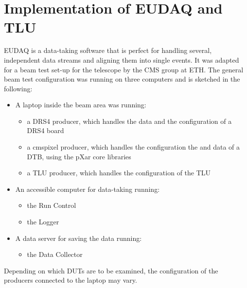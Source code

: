 \section{Implementation of EUDAQ and \ac{TLU}}
EUDAQ is a data-taking software that is perfect for handling several, independent data streams and aligning them into single events. It was adapted for a beam test set-up for the telescope by the CMS group at \ac{ETH}.
The general beam test configuration was running on three computers and is sketched in the following:
\begin{itemize}
	\item A laptop inside the beam area was running:
		\begin{itemize}
			\item a DRS4 producer, which handles the data and the configuration of a DRS4 board
			\item a cmspixel producer, which handles the configuration the and data of a \ac{DTB}, using the pXar core libraries
			\item a \ac{TLU} producer, which handles the configuration of the \ac{TLU} 
		\end{itemize}
	\item An accessible computer for data-taking running:
		\begin{itemize}
			\item the Run Control
			\item the Logger
		\end{itemize}
	\item A data server for saving the data running:
		\begin{itemize}
			\item the Data Collector
		\end{itemize}
\end{itemize}
Depending on which \ac{DUT}s are to be examined, the configuration of the producers connected to the laptop may vary.
